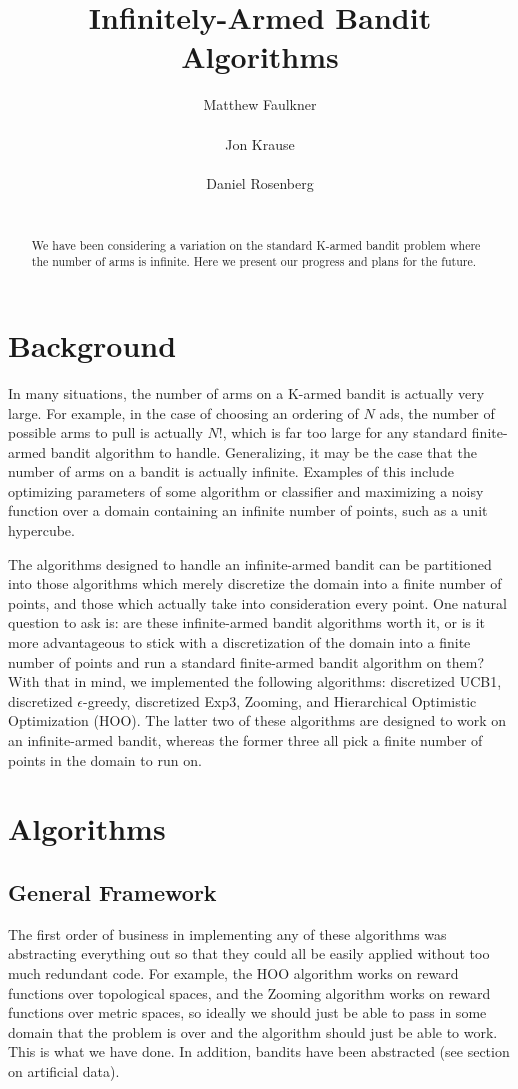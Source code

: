 \documentclass{article}
\title{Infinitely-Armed Bandit Algorithms}
\author{
Matthew Faulkner\\
\\
\And
Jon Krause \\
\\
\And
Daniel Rosenberg \\
\\
}
\begin{document}
\maketitle

\begin{abstract}
We have been considering a variation on the standard K-armed bandit 
problem where the number of arms is infinite.  Here we present
our progress and plans for the future.
\end{abstract}

\section{Background}
In many situations, the number of arms on a K-armed bandit is actually
very large.  For example, in the case of choosing an ordering of $N$ ads,
the number of possible arms to pull is actually $N!$, which is far too
large for any standard finite-armed bandit algorithm to handle.
Generalizing, it may be the case that the number of arms on a bandit is
actually infinite.  Examples of this include optimizing parameters of
some algorithm or classifier and maximizing a noisy function over a domain
containing an infinite number of points, such as a unit hypercube.

The algorithms designed to handle an infinite-armed bandit can be
partitioned into those algorithms which merely discretize the domain
into a finite number of points, and those which actually take into
consideration every point.  One natural question to ask is: are these
infinite-armed bandit algorithms worth it, or is it more advantageous
to stick with a discretization of the domain into a finite number of
points and run a standard finite-armed bandit algorithm on them?
With that in mind, we implemented the following algorithms: discretized
UCB1, discretized $\epsilon$-greedy, discretized Exp3,
Zooming\cite{Zooming}, and
Hierarchical Optimistic Optimization (HOO)\cite{xArmed}.
The latter two of these
algorithms are designed to work on an infinite-armed bandit, whereas the
former three all pick a finite number of points in the domain to run on.


\section{Algorithms}
\subsection{General Framework}
The first order of business in implementing any of these algorithms was
abstracting everything out so that they could all be easily applied
without too much redundant code.  For example, the HOO algorithm works
on reward functions over topological spaces, and the Zooming algorithm
works on reward functions over metric spaces, so ideally we should just
be able to pass in some domain that the problem is over and the algorithm
should just be able to work.  This is what we have done.  In addition,
bandits have been abstracted (see section on artificial data).
\end{document}
